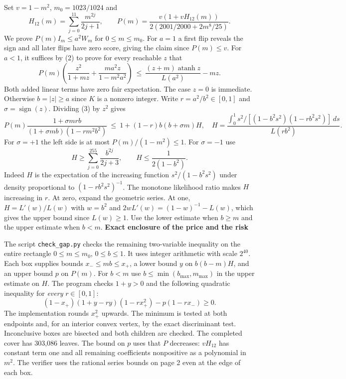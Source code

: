 \documentclass[11pt]{article}
\newcommand{\atanh}{\operatorname{atanh}}
\newcommand{\heading}[1]{{\LARGE\bfseries\color{ink} #1}\par\smallskip}
\begin{document}
Set $v=1-m^2$, $m_0=1023/1024$ and
\[
 H_{12}(m)=\sum_{j=0}^{11}\frac{m^{2j}}{2j+1},\qquad
 P(m)=\frac{v(1+vH_{12}(m))}{2(2001/2000+2m^8/25)} .
\]
We prove $P(m)I_m\le a^2W_m$ for $0\le m\le m_0$. For $a=1$ a first flip reveals the sign and all later flips have zero score, giving the claim since $P(m)\le v$. For $a<1$, it suffices by (2) to prove for every reachable $z$ that
\[
 P(m)\left(\frac{z^2}{1+mz}+\frac{ma^2z}{1-m^2a^2}\right)
 \ \le\ \frac{(z+m)\atanh z}{L(a^2)}-mz .
 \tag{3}
\]
Both added linear terms have zero fair expectation. The case $z=0$ is immediate. Otherwise $b=|z|\ge a$ since $K$ is a nonzero integer. Write $r=a^2/b^2\in[0,1]$ and $\sigma=\operatorname{sign}(z)$. Dividing (3) by $z^2$ gives
\[
 P(m)\frac{1+\sigma mrb}{(1+\sigma mb)(1-rm^2b^2)}
 \ \le\ 1+(1-r)b(b+\sigma m)H ,
 \quad H=\frac{\int_0^1 s^2/[(1-b^2s^2)(1-rb^2s^2)]\,ds}{L(rb^2)} .
 \tag{4}
\]
For $\sigma=+1$ the left side is at most $P(m)/(1-m^2)\le1$. For $\sigma=-1$ use
\[
 H\ge\sum_{j=0}^{255}\frac{b^{2j}}{2j+3},\qquad
 H\le\frac{1}{2(1-b^2)} .
\]
Indeed $H$ is the expectation of the increasing function $s^2/(1-b^2s^2)$ under density proportional to $(1-rb^2s^2)^{-1}$. The monotone likelihood ratio makes $H$ increasing in $r$. At zero, expand the geometric series. At one, $H=L'(w)/L(w)$ with $w=b^2$ and $2wL'(w)=(1-w)^{-1}-L(w)$, which gives the upper bound since $L(w)\ge1$. Use the lower estimate when $b\ge m$ and the upper estimate when $b<m$.
\newpage
\heading{Exact enclosure of the price and the risk}
The script \texttt{check\_gap.py} checks the remaining two-variable inequality on the entire rectangle $0\le m\le m_0$, $0\le b\le1$. It uses integer arithmetic with scale $2^{40}$. Each box supplies bounds $x_-\le mb\le x_+$, a lower bound $y$ on $b(b-m)H$, and an upper bound $p$ on $P(m)$. For $b<m$ use $b\le\min(b_{\max},m_{\max})$ in the upper estimate on $H$. The program checks $1+y>0$ and the following quadratic inequality for \emph{every} $r\in[0,1]$:
\[
 (1-x_+)(1+y-ry)(1-r x_+^2)-p(1-r x_-)\ge0 .
\]
The implementation rounds $x_+^2$ upwards. The minimum is tested at both endpoints and, for an interior convex vertex, by the exact discriminant test. Inconclusive boxes are bisected and both children are checked. The completed cover has 303,086 leaves. The bound on $p$ uses that $P$ decreases: $vH_{12}$ has constant term one and all remaining coefficients nonpositive as a polynomial in $m^2$. The verifier uses the rational series bounds on page 2 even at the edge of each box.
\end{document}
